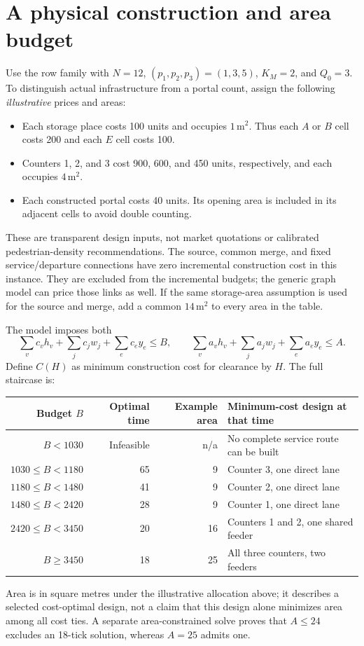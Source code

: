 \documentclass[11pt]{article}
\begin{document}
\section{A physical construction and area budget}
Use the row family with $N=12$, $(p_1,p_2,p_3)=(1,3,5)$, $K_M=2$, and $Q_0=3$. To distinguish actual infrastructure from a portal count, assign the following \emph{illustrative} prices and areas:
\begin{itemize}
\item Each storage place costs 100 units and occupies $1\,\mathrm{m}^2$. Thus each $A$ or $B$ cell costs 200 and each $E$ cell costs 100.
\item Counters 1, 2, and 3 cost 900, 600, and 450 units, respectively, and each occupies $4\,\mathrm{m}^2$.
\item Each constructed portal costs 40 units. Its opening area is included in its adjacent cells to avoid double counting.
\end{itemize}
These are transparent design inputs, not market quotations or calibrated pedestrian-density recommendations. The source, common merge, and fixed service/departure connections have zero incremental construction cost in this instance. They are excluded from the incremental budgets; the generic graph model can price those links as well. If the same storage-area assumption is used for the source and merge, add a common $14\,\mathrm{m}^2$ to every area in the table.

The model imposes both
\[
 \sum_v c_vh_v+\sum_j c_jw_j+\sum_e c_ey_e\le B,
 \qquad
 \sum_v a_vh_v+\sum_j a_jw_j+\sum_e a_ey_e\le A.
\]
Define $C(H)$ as minimum construction cost for clearance by $H$. The full staircase is:

\begin{center}\small
\begin{tabular}{rrrl}
\toprule
Budget $B$&Optimal time&Example area&Minimum-cost design at that time\\\midrule
$B<1030$&Infeasible&n/a&No complete service route can be built\\
$1030\le B<1180$&65&9&Counter 3, one direct lane\\
$1180\le B<1480$&41&9&Counter 2, one direct lane\\
$1480\le B<2420$&28&9&Counter 1, one direct lane\\
$2420\le B<3450$&20&16&Counters 1 and 2, one shared feeder\\
$B\ge3450$&18&25&All three counters, two feeders\\
\bottomrule
\end{tabular}
\end{center}
Area is in square metres under the illustrative allocation above; it describes a selected cost-optimal design, not a claim that this design alone minimizes area among all cost ties. A separate area-constrained solve proves that $A\le24$ excludes an 18-tick solution, whereas $A=25$ admits one.
\end{document}
